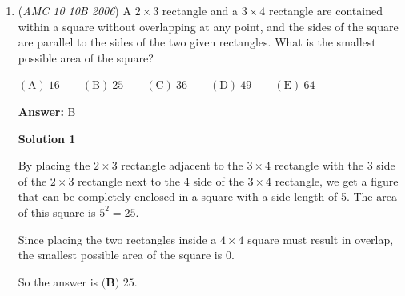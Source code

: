 \begin{enumerate}
$\mathrm{(A) \ } 2\qquad \mathrm{(B) \ } 3\qquad \mathrm{(C) \ } 6\qquad \mathrm{(D) \ } 8\qquad \mathrm{(E) \ } 9$

 \textbf{Answer: }D



\textbf{Solution}

The area painted red is equal to the area of the smaller circle and the area painted blue is equal to the area of the larger circle minus the area of the smaller circle. 

 So we have:

 
 \begin{align*} A_{red}&=\pi\left(\frac{1}{2}\right)^2=\frac{\pi}{4}\\ A_{blue}&=\pi\left(\frac{3}{2}\right)^2-\pi\left(\frac{1}{2}\right)^2=2\pi\\ \end{align*}


 So the desired ratio is: 

 $\frac{A_{blue}}{A_{red}}=\frac{2\pi}{\frac{\pi}{4}}=2\cancel{\pi}\cdot \frac{4}{\cancel{\pi}}=\boxed{\textbf{(D) }8}.$



	\item (\textit{AMC 10 10B 2006}) A $2 \times 3$ rectangle and a $3 \times 4$ rectangle are contained within a square without overlapping at any point, and the sides of the square are parallel to the sides of the two given rectangles. What is the smallest possible area of the square? 


 $\mathrm{(A) \ } 16\qquad \mathrm{(B) \ } 25\qquad \mathrm{(C) \ } 36\qquad \mathrm{(D) \ } 49\qquad \mathrm{(E) \ } 64$

 \textbf{Answer: }B



\textbf{Solution 1}

By placing the $2 \times 3$ rectangle adjacent to the $3 \times 4$ rectangle with the 3 side of the $2 \times 3$ rectangle next to the 4 side of the $3 \times 4$ rectangle, we get a figure that can be completely enclosed in a square with a side length of 5. The area of this square is $5^2 = 25$.

 Since placing the two rectangles inside a $4 \times 4$ square must result in overlap, the smallest possible area of the square is $0$.

 So the answer is $\boxed{\textbf{(B) }25}$.

 




\end{enumerate}
